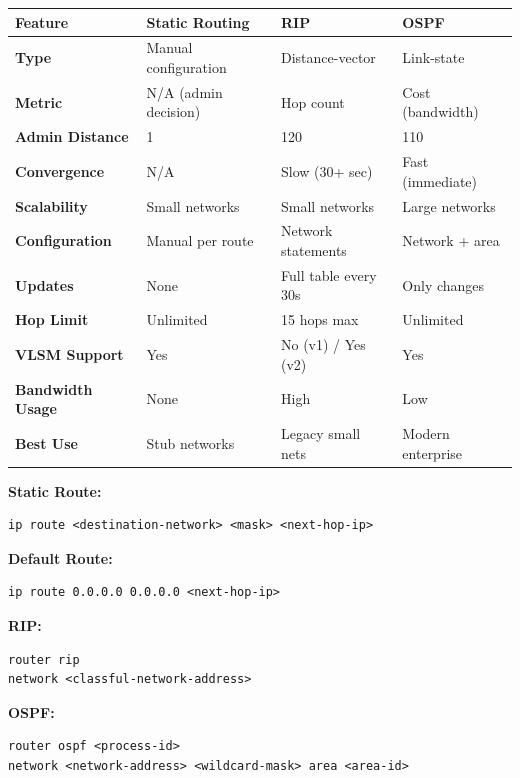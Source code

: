 \documentclass[12pt,a4paper]{article}
\begin{document}
\begin{center}
\begin{tcolorbox}[colback=light,colframe=primary,title=\textbf{\large Routing Methods Comparison},width=0.95\textwidth]
\begin{center}
\begin{tabular}{p{3cm}p{3.5cm}p{3.5cm}p{3.5cm}}
\toprule
\textbf{Feature} & \textbf{Static Routing} & \textbf{RIP} & \textbf{OSPF} \\
\midrule
\textbf{Type} & Manual configuration & Distance-vector & Link-state \\[0.2cm]
\textbf{Metric} & N/A (admin decision) & Hop count & Cost (bandwidth) \\[0.2cm]
\textbf{Admin Distance} & 1 & 120 & 110 \\[0.2cm]
\textbf{Convergence} & N/A & Slow (30+ sec) & Fast (immediate) \\[0.2cm]
\textbf{Scalability} & Small networks & Small networks & Large networks \\[0.2cm]
\textbf{Configuration} & Manual per route & Network statements & Network + area \\[0.2cm]
\textbf{Updates} & None & Full table every 30s & Only changes \\[0.2cm]
\textbf{Hop Limit} & Unlimited & 15 hops max & Unlimited \\[0.2cm]
\textbf{VLSM Support} & Yes & No (v1) / Yes (v2) & Yes \\[0.2cm]
\textbf{Bandwidth Usage} & None & High & Low \\[0.2cm]
\textbf{Best Use} & Stub networks & Legacy small nets & Modern enterprise \\[0.2cm]
\bottomrule
\end{tabular}
\end{center}
\end{tcolorbox}
\end{center}

\vspace{0.5cm}

\begin{center}
\begin{tcolorbox}[colback=accent!10,colframe=accent,title=\textbf{\large Command Syntax Quick Reference},width=0.95\textwidth]
\textbf{Static Route:}
\begin{lstlisting}
ip route <destination-network> <mask> <next-hop-ip>
\end{lstlisting}

\textbf{Default Route:}
\begin{lstlisting}
ip route 0.0.0.0 0.0.0.0 <next-hop-ip>
\end{lstlisting}

\textbf{RIP:}
\begin{lstlisting}
router rip
network <classful-network-address>
\end{lstlisting}

\textbf{OSPF:}
\begin{lstlisting}
router ospf <process-id>
network <network-address> <wildcard-mask> area <area-id>
\end{lstlisting}
\end{tcolorbox}
\end{center}
\end{document}
